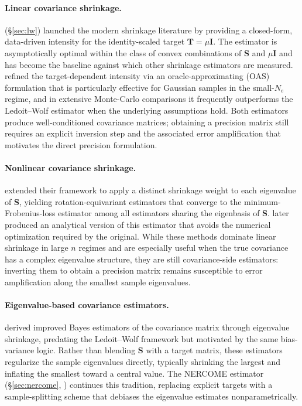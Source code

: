 \paragraph{Linear covariance shrinkage.}
\citet{ledoit2004well} (§\ref{sec:lw}) launched the modern shrinkage literature by providing a closed-form, data-driven intensity for the identity-scaled target $\mathbf{T} = \mu \mathbf{I}$. The estimator is asymptotically optimal within the class of convex combinations of $\mathbf{S}$ and $\mu\mathbf{I}$ and has become the baseline against which other shrinkage estimators are measured. \citet{chen2010shrinkage} refined the target-dependent intensity via an oracle-approximating (OAS) formulation that is particularly effective for Gaussian samples in the small-$N_e$ regime, and in extensive Monte-Carlo comparisons it frequently outperforms the Ledoit–Wolf estimator when the underlying assumptions hold. Both estimators produce well-conditioned covariance matrices; obtaining a precision matrix still requires an explicit inversion step and the associated error amplification that motivates the direct precision formulation.

\paragraph{Nonlinear covariance shrinkage.}
\citet{ledoit2012nonlinear} extended their framework to apply a distinct shrinkage weight to each eigenvalue of $\mathbf{S}$, yielding rotation-equivariant estimators that converge to the minimum-Frobenius-loss estimator among all estimators sharing the eigenbasis of $\mathbf{S}$. \citet{ledoit2020analytical} later produced an analytical version of this estimator that avoids the numerical optimization required by the original. While these methods dominate linear shrinkage in large $n$ regimes and are especially useful when the true covariance has a complex eigenvalue structure, they are still covariance-side estimators: inverting them to obtain a precision matrix remains susceptible to error amplification along the smallest sample eigenvalues.

\paragraph{Eigenvalue-based covariance estimators.}
\citet{haff1991variational} derived improved Bayes estimators of the covariance matrix through eigenvalue shrinkage, predating the Ledoit–Wolf framework but motivated by the same bias-variance logic. Rather than blending $\mathbf{S}$ with a target matrix, these estimators regularize the sample eigenvalues directly, typically shrinking the largest and inflating the smallest toward a central value. The NERCOME estimator (§\ref{sec:nercome}, \citealt{lam2016nonparametric}) continues this tradition, replacing explicit targets with a sample-splitting scheme that debiases the eigenvalue estimates nonparametrically.

